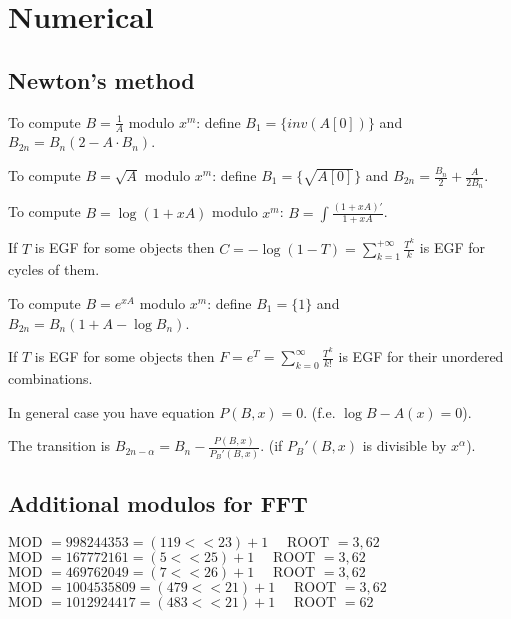 \chapter{Numerical}
\section{Newton's method}
	To compute $B = \frac{1}{A}$ modulo $x^m$: define $B_1 = \{inv(A[0])\}$ and $B_{2n} = B_n (2 - A \cdot B_n)$.


	To compute $B = \sqrt{A}$ modulo $x^m$: define $B_1 = \{\sqrt{A[0]}\}$ and $B_{2n} = \frac{B_n}{2} + \frac{A}{2B_n}$.


	To compute $B = \log (1 + xA)$ modulo $x^m$: $B = \int\frac{(1 + xA)'}{1 + xA}$.

	If $T$ is EGF for some objects then $C = -\log (1 - T) = \sum_{k = 1}^{+\infty} \frac{T^k}{k}$ is EGF for cycles of them.


	To compute $B = e^{xA}$ modulo $x^m$: define $B_1 = \{1\}$ and $B_{2n} = B_n(1 + A - \log B_n)$.

	If $T$ is EGF for some objects then $F = e^T = \sum_{k = 0}^{\infty} \frac{T^k}{k!}$ is EGF for their unordered combinations.

	In general case you have equation $P(B, x) = 0$. (f.e. $\log B - A(x) = 0$).

	The transition is $B_{2n - \alpha} = B_n - \frac{P(B, x)}{P_B'(B, x)}$. (if $P_B'(B, x)$ is divisible by $x^\alpha$).
\section{Additional modulos for FFT}
$\text{MOD } = 998244353 = (119 << 23) + 1 \quad \text{ ROOT } = 3, 62$
$\text{MOD } = 167772161 = (5 << 25) + 1 \quad \text{ ROOT } = 3, 62$
$\text{MOD } = 469762049 = (7 << 26) + 1 \quad \text{ ROOT } = 3, 62$
$\text{MOD } = 1004535809 = (479 << 21) + 1 \quad \text{ ROOT } = 3, 62$
$\text{MOD } = 1012924417 = (483 << 21) + 1 \quad \text{ ROOT } = 62$

